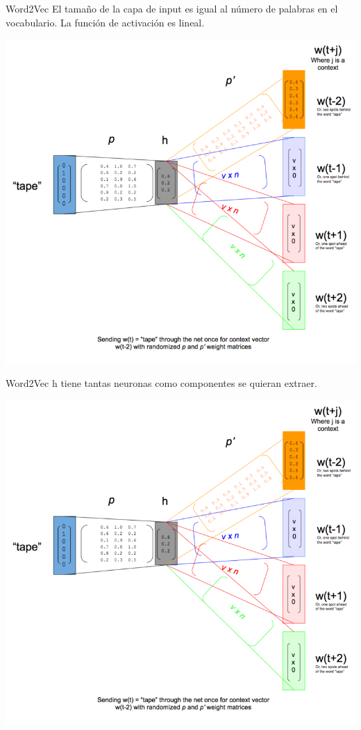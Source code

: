 \documentclass[table]{beamer}
\begin{document}
  \begin{frame}{Word2Vec}
      El tamaño de la capa de input es igual al número de palabras en el vocabulario. La función de activación es lineal.

      \centering
      \includegraphics[scale=0.50]{./figures/skip-gram-exp.png}
  \end{frame}

  \begin{frame}{Word2Vec}
      h tiene tantas neuronas como componentes se quieran extraer.

      \centering
      \includegraphics[scale=0.50]{./figures/skip-gram-exp.png}
  \end{frame}
\end{document}
